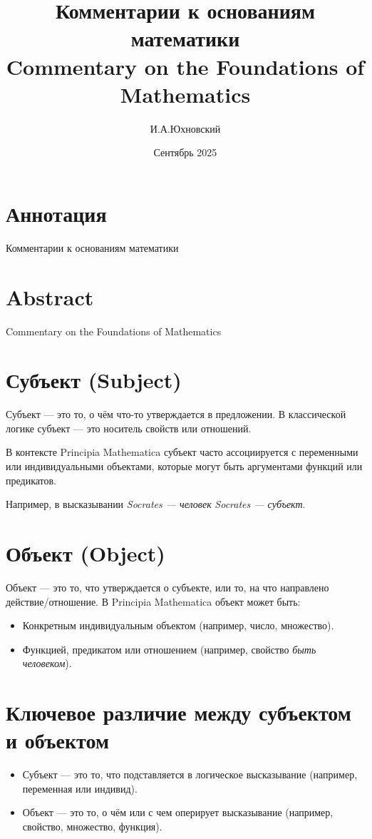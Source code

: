 \documentclass[a4paper, 12pt]{article}
\title{\textbf{Комментарии к основаниям математики \\
	Commentary on the Foundations of Mathematics}}
\author{И.А.Юхновский}
\date{Сентябрь 2025}
\begin{document}
\maketitle
\thispagestyle{empty}
\section*{Аннотация}
Комментарии к основаниям математики

\section*{Abstract}
Commentary on the Foundations of Mathematics

\section{Субъект (Subject)}
Субъект — это то, о чём что-то утверждается в предложении.
В классической логике субъект — это носитель свойств или отношений.

В контексте Principia Mathematica субъект часто ассоциируется с переменными или индивидуальными объектами, которые могут быть аргументами функций или предикатов.

Например, в высказывании \textit{Socrates — человек}  \textit{Socrates — субъект}.

\section{Объект (Object)}
Объект — это то, что утверждается о субъекте, или то, на что направлено действие/отношение.
В Principia Mathematica объект может быть:
\begin{itemize}
\item  Конкретным индивидуальным объектом (например, число, множество).
\item  Функцией, предикатом или отношением (например, свойство \textit{быть человеком}).
\end{itemize}

\section{Ключевое различие между субъектом и объектом}
\begin{itemize} 
\item  Субъект — это то, что подставляется в логическое высказывание (например, переменная или индивид).
\item  Объект — это то, о чём или с чем оперирует высказывание (например, свойство, множество, функция).
\end{itemize} 
\end{document}
